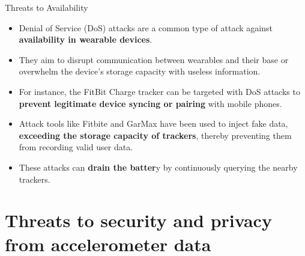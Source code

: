 \documentclass[ucs,9pt]{beamer}
\begin{document}
\begin{frame}{Threats to Availability}
	\begin{itemize}
		\item Denial of Service (DoS) attacks are a common type of attack against \textbf{availability in wearable devices}. 
		\item They aim to disrupt communication between wearables and their base or overwhelm the device's storage capacity with useless information. 
		\item For instance, the FitBit Charge tracker can be targeted with DoS attacks to \textbf{prevent legitimate device syncing or pairing} with mobile phones.
		\item Attack tools like Fitbite and GarMax have been used to inject fake data, \textbf{exceeding the storage capacity of trackers}, thereby preventing them from recording valid user data.
		\item These attacks can \textbf{drain the batter}y by continuously querying the nearby trackers. 
	\end{itemize}
\end{frame}



\section{Threats to security and privacy from accelerometer data}
\end{document}
